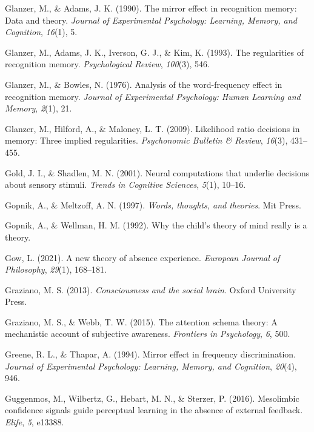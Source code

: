 \documentclass[12pt,twoside]{reedthesis}
\newenvironment{CSLReferences}%
  {}%
  {\par}
\begin{document}
\begin{CSLReferences}{1}{0}
\leavevmode\hypertarget{ref-glanzer1990mirror}{}%
Glanzer, M., \& Adams, J. K. (1990). The mirror effect in recognition memory: Data and theory. \emph{Journal of Experimental Psychology: Learning, Memory, and Cognition}, \emph{16}(1), 5.

\leavevmode\hypertarget{ref-glanzer1993regularities}{}%
Glanzer, M., Adams, J. K., Iverson, G. J., \& Kim, K. (1993). The regularities of recognition memory. \emph{Psychological Review}, \emph{100}(3), 546.

\leavevmode\hypertarget{ref-glanzer1976analysis}{}%
Glanzer, M., \& Bowles, N. (1976). Analysis of the word-frequency effect in recognition memory. \emph{Journal of Experimental Psychology: Human Learning and Memory}, \emph{2}(1), 21.

\leavevmode\hypertarget{ref-glanzer2009likelihood}{}%
Glanzer, M., Hilford, A., \& Maloney, L. T. (2009). Likelihood ratio decisions in memory: Three implied regularities. \emph{Psychonomic Bulletin \& Review}, \emph{16}(3), 431--455.

\leavevmode\hypertarget{ref-gold2001neural}{}%
Gold, J. I., \& Shadlen, M. N. (2001). Neural computations that underlie decisions about sensory stimuli. \emph{Trends in Cognitive Sciences}, \emph{5}(1), 10--16.

\leavevmode\hypertarget{ref-gopnik1997words}{}%
Gopnik, A., \& Meltzoff, A. N. (1997). \emph{Words, thoughts, and theories}. Mit Press.

\leavevmode\hypertarget{ref-gopnik1992child}{}%
Gopnik, A., \& Wellman, H. M. (1992). Why the child's theory of mind really is a theory.

\leavevmode\hypertarget{ref-gow2021new}{}%
Gow, L. (2021). A new theory of absence experience. \emph{European Journal of Philosophy}, \emph{29}(1), 168--181.

\leavevmode\hypertarget{ref-graziano2013consciousness}{}%
Graziano, M. S. (2013). \emph{Consciousness and the social brain}. Oxford University Press.

\leavevmode\hypertarget{ref-graziano2015attention}{}%
Graziano, M. S., \& Webb, T. W. (2015). The attention schema theory: A mechanistic account of subjective awareness. \emph{Frontiers in Psychology}, \emph{6}, 500.

\leavevmode\hypertarget{ref-greene1994mirror}{}%
Greene, R. L., \& Thapar, A. (1994). Mirror effect in frequency discrimination. \emph{Journal of Experimental Psychology: Learning, Memory, and Cognition}, \emph{20}(4), 946.

\leavevmode\hypertarget{ref-guggenmos2016mesolimbic}{}%
Guggenmos, M., Wilbertz, G., Hebart, M. N., \& Sterzer, P. (2016). Mesolimbic confidence signals guide perceptual learning in the absence of external feedback. \emph{Elife}, \emph{5}, e13388.


\end{CSLReferences}
\end{document}
